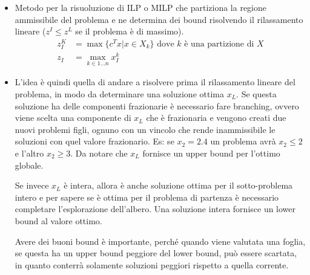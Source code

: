 \begin{itemize}
	\item Metodo per la risuoluzione di ILP o MILP che partiziona la regione ammissibile del problema e ne determina dei bound risolvendo il rilassamento lineare ($z^I \leq z^L$ se il problema è di massimo).
	\begin{align*}
		z_{I}^K &= \max \{ c^T x | x \in X_k \} \text{ dove $k$ è una partizione di $X$} \\
		z_I &= \max \limits_{k \in 1\ldots n} x_{I}^k
	\end{align*}
	\item L'idea è quindi quella di andare a risolvere prima il rilassamento lineare del problema, in modo da determinare una soluzione ottima $x_L$. Se questa soluzione ha delle componenti frazionarie è necessario fare branching, ovvero viene scelta una componente di $x_L$ che è frazionaria e vengono creati due nuovi problemi figli, ognuno con un vincolo che rende inammissibile le soluzioni con quel valore frazionario. Es: se $x_2 = 2.4$ un problema avrà $x_2 \leq 2$ e l'altro $x_2 \geq 3$.
	Da notare che $x_L$ fornisce un upper bound per l'ottimo globale.
	
	Se invece $x_L$ è intera, allora è anche soluzione ottima per il sotto-problema intero e per sapere se è ottima per il problema di partenza è necessario completare l'esplorazione dell'albero.
	Una soluzione intera fornisce un lower bound al valore ottimo.
	
	Avere dei buoni bound è importante, perché quando viene valutata una foglia, se questa ha un upper bound peggiore del lower bound, può essere scartata, in quanto conterrà solamente soluzioni peggiori rispetto a quella corrente.
	

\end{itemize}

